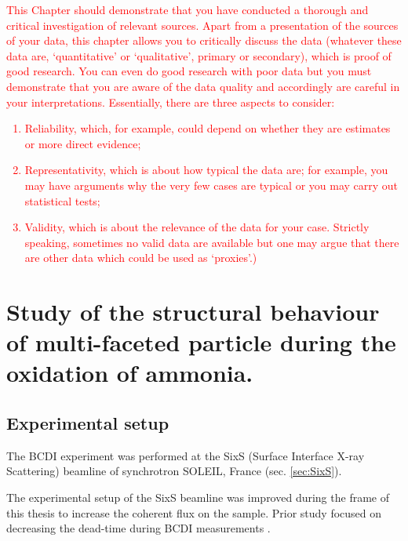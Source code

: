 \textcolor{red}{This Chapter should demonstrate that you have conducted a thorough and critical investigation of relevant sources.
Apart from a presentation of the sources of your data, this chapter allows you to critically discuss the data (whatever these data are, ‘quantitative’ or ‘qualitative’, primary or secondary), which is proof of good research. You can even do good research with poor data but you must demonstrate that you are aware of the data quality and accordingly are careful in your interpretations. Essentially, there are three aspects to consider:
\begin{enumerate}
\item	Reliability, which, for example, could depend on whether they are estimates or more direct evidence;
\item	Representativity, which is about how typical the data are; for example, you may have arguments why the very few cases are typical or you may carry out statistical tests;
\item Validity, which is about the relevance of the data for your case. Strictly speaking, sometimes no valid data are available but one may argue that there are other data which could be used as ‘proxies’.) 
\end{enumerate}
}

\section{Study of the structural behaviour of multi-faceted particle during the oxidation of ammonia.}

\subsection{Experimental setup}

The BCDI experiment was performed at the SixS (Surface Interface X-ray Scattering) beamline of synchrotron SOLEIL, France (sec. \ref{sec:SixS}).

The experimental setup of the SixS beamline was improved during the frame of this thesis to increase the coherent flux on the sample.
Prior study focused on decreasing the dead-time during BCDI measurements \parencite{Li2020}.

